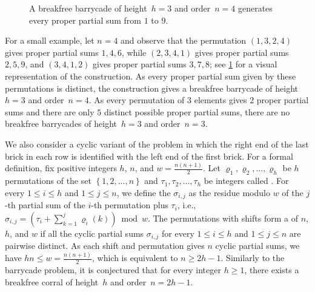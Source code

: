 \documentclass[runningheads,envcountsame]{llncs}
\newcommand{\set}[1]{\left\{ #1 \right\}}
\newcommand{\brac}[1]{\left( #1 \right)}
\let\le\leqslant
\let\ge\geqslant
\let\rho\varrho
\begin{document}
\begin{figure}[ht]
    \centering
    \caption{A breakfree barrycade of height~\(h=3\) and order~\(n=4\) generates every proper partial sum from $1$ to $9$.}
    \label{fig:barrycade}
\end{figure}
For a small example, let $n = 4$ and observe that the permutation $(1, 3, 2, 4)$ gives proper partial sums $1, 4, 6$, while $(2, 3, 4, 1)$ gives proper partial sums $2, 5, 9$, and $(3, 4, 1, 2)$ gives proper partial sums $3, 7, 8$; see \cref{fig:barrycade} for a visual representation of the construction.
As every proper partial sum given by these permutations is distinct, the construction gives a breakfree barrycade of height~$h=3$ and order~$n=4$.
As every permutation of $3$ elements gives $2$ proper partial sums and there are only $5$ distinct possible proper partial sums, there are no breakfree barrycades of height~$h=3$ and order~$n=3$.

We also consider a cyclic variant of the problem in which the right end of the last brick in each row is identified with the left end of the first brick.
For a formal definition, fix positive integers $h$, $n$, and $w=\frac{n(n+1)}{2}$.
Let $\rho_1,\rho_2,\ldots,\rho_h$ be $h$ permutations of the set $\set{1,2,\ldots,n}$ and $\tau_1,\tau_2,\ldots,\tau_h$ be integers called .
For every $1\le i \le h$ and $1 \le j \le n$, we define the  $\sigma_{i,j}$ as the residue modulo $w$ of the $j$-th partial sum of the $i$-th permutation plus $\tau_i$, i.e., $\sigma_{i,j} = \brac{\tau_i + \sum_{k=1}^{j} \rho_i(k)} \bmod w$.
The permutations with shifts form a  of  $n$,  $h$, and  $w$ if all the cyclic partial sums $\sigma_{i,j}$ for every $1 \le i \le h$ and $1 \le j \le n$ are pairwise distinct.
As each shift and permutation gives $n$ cyclic partial sums, we have $hn \le w = \frac{n(n+1)}{2}$, which is equivalent to $n \ge 2h-1$.
Similarly to the barrycade problem, it is conjectured that for every integer $h \ge 1$, there exists a breakfree corral of height~$h$ and order~$n=2h-1$.
\end{document}
